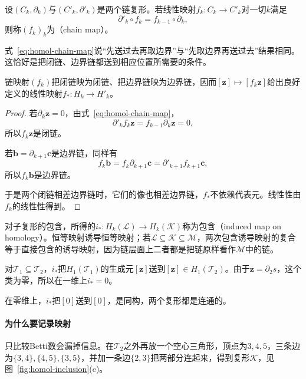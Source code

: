 \begin{definition}[链映射]
\label{def:homol-chain-map}
设$(C_k,\partial_k)$与$(C'_k,\partial'_k)$是两个链复形。若线性映射$f_k:C_k\to C'_k$对一切$k$满足
\begin{equation}
 \partial'_k\circ f_k=f_{k-1}\circ\partial_k,
 \label{eq:homol-chain-map}
\end{equation}
则称$(f_k)_k$为（chain map）。
\end{definition}

式~\eqref{eq:homol-chain-map}说“先送过去再取边界”与“先取边界再送过去”结果相同。这恰好是把闭链、边界链都送到相应位置所需要的条件。

\begin{lemma}[链映射诱导同调映射]
\label{lem:homol-chain-map-induces}
链映射$(f_k)$把闭链映为闭链、把边界链映为边界链，因而$[\bm z]\mapsto[f_k\bm z]$给出良好定义的线性映射$f_*:H_k\to H'_k$。
\end{lemma}

\begin{proof}
若$\partial_k\bm z=0$，由式~\eqref{eq:homol-chain-map}，
\[
 \partial'_kf_k\bm z=f_{k-1}\partial_k\bm z=0,
\]
所以$f_k\bm z$是闭链。

若$\bm b=\partial_{k+1}\bm c$是边界链，同样有
\[
 f_k\bm b=f_k\partial_{k+1}\bm c=\partial'_{k+1}f_{k+1}\bm c,
\]
所以$f_k\bm b$是边界链。

于是两个闭链相差边界链时，它们的像也相差边界链，$f_*$不依赖代表元。线性性由$f_k$的线性性得到。
\end{proof}

对子复形的包含，所得的$i_*:H_k(\mathcal L)\to H_k(\mathcal K)$称为包含（induced map on homology）。恒等映射诱导恒等映射；若$\mathcal L\subseteq\mathcal K\subseteq\mathcal M$，两次包含诱导映射的复合等于直接包含的诱导映射，因为链层面上二者都是把链原样看作$\mathcal M$中的链。

\begin{example}[填入三角形使一维类变为零]
\label{ex:homol-inclusion-kills-cycle}
对$\mathcal T_1\subseteq\mathcal T_2$，$i_*$把$H_1(\mathcal T_1)$的生成元$[\bm z]$送到$[\bm z]\in H_1(\mathcal T_2)$。由于$\bm z=\partial_2s$，这个类为零，所以在一维上$i_*=0$。

在零维上，$i_*$把$[0]$送到$[0]$，是同构，两个复形都是连通的。
\end{example}

\paragraph{为什么要记录映射}
只比较Betti数会漏掉信息。在$\mathcal T_2$之外再放一个空心三角形，顶点为$3,4,5$，三条边为$\{3,4\},\{4,5\},\{3,5\}$，并加一条边$\{2,3\}$把两部分连起来，得到复形$\mathcal K$，见图~\ref{fig:homol-inclusion}(c)。

